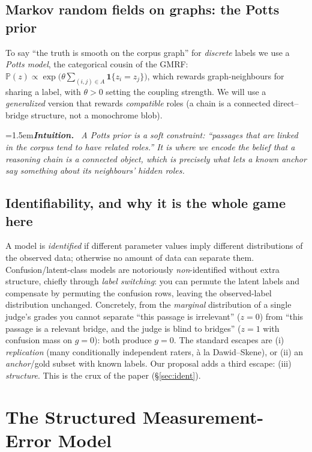 \documentclass[11pt]{article}
\newenvironment{intuition}{\par\smallskip\noindent\hangindent=1.5em\textbf{\itshape Intuition.}\itshape\ \ignorespaces}{\par\smallskip}
\renewcommand{\Pr}{\mathbb{P}}
\begin{document}
\subsection{Markov random fields on graphs: the Potts prior}
To say ``the truth is smooth on the corpus graph'' for \emph{discrete} labels we use a \emph{Potts model}, the
categorical cousin of the GMRF: $\Pr(z)\propto\exp\!\big(\theta\sum_{(i,j)\in A}\mathbf 1\{z_i\!=\!z_j\}\big)$,
which rewards graph-neighbours for sharing a label, with $\theta>0$ setting the coupling strength. We will use a
\emph{generalized} version that rewards \emph{compatible} roles (a chain is a connected direct--bridge
structure, not a monochrome blob).
\begin{intuition}
A Potts prior is a soft constraint: ``passages that are linked in the corpus tend to have related roles.'' It is
where we encode the belief that a reasoning chain is a \emph{connected} object, which is precisely what lets a
known anchor say something about its neighbours' hidden roles.
\end{intuition}

\subsection{Identifiability, and why it is the whole game here}\label{sec:idprelim}
A model is \emph{identified} if different parameter values imply different distributions of the observed data;
otherwise no amount of data can separate them. Confusion/latent-class models are notoriously \emph{non}-identified
without extra structure, chiefly through \emph{label switching}: you can permute the latent labels and
compensate by permuting the confusion rows, leaving the observed-label distribution unchanged. Concretely, from
the \emph{marginal} distribution of a single judge's grades you cannot separate ``this passage is irrelevant''
($z{=}0$) from ``this passage is a relevant bridge, and the judge is blind to bridges'' ($z{=}1$ with confusion
mass on $g{=}0$): both produce $g{=}0$. The standard escapes are (i) \emph{replication} (many conditionally
independent raters, à la Dawid--Skene), or (ii) an \emph{anchor}/gold subset with known labels. Our proposal
adds a third escape: (iii) \emph{structure}. This is the crux of the paper (\S\ref{sec:ident}).

\section{The Structured Measurement-Error Model}\label{sec:model}
\end{document}
